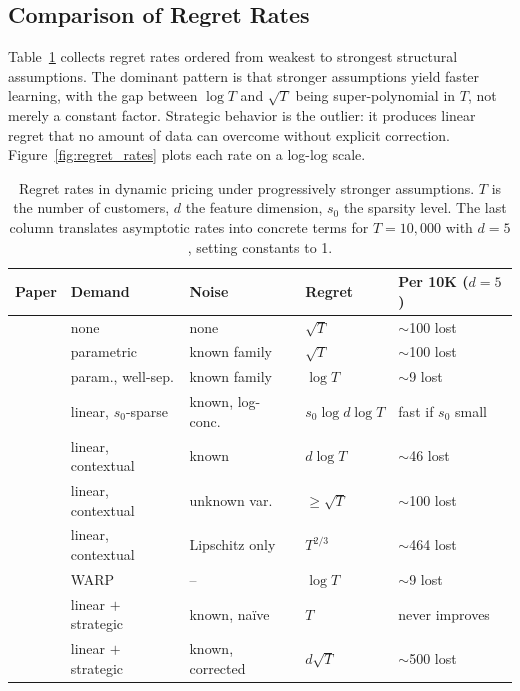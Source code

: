 \subsection{Comparison of Regret Rates}
\label{sec:comparison}

Table~\ref{tab:regret_comparison} collects regret rates ordered from weakest to strongest structural assumptions. The dominant pattern is that stronger assumptions yield faster learning, with the gap between $\log T$ and $\sqrt{T}$ being super-polynomial in $T$, not merely a constant factor. Strategic behavior is the outlier: it produces linear regret that no amount of data can overcome without explicit correction. Figure~\ref{fig:regret_rates} plots each rate on a log-log scale.

\begin{table}[!htbp]
\centering
\small
\caption{Regret rates in dynamic pricing under progressively stronger assumptions. $T$ is the number of customers, $d$ the feature dimension, $s_0$ the sparsity level. The last column translates asymptotic rates into concrete terms for $T = 10{,}000$ with $d = 5$, setting constants to 1.}
\label{tab:regret_comparison}
\begin{tabular}{@{}llllp{2.8cm}@{}}
\toprule
Paper & Demand & Noise & Regret & Per 10K ($d{=}5$) \\
\midrule
\citet{Kleinberg2003} & none & none & $\sqrt{T}$ & $\sim$100 lost \\
\citet{Broder2012} & parametric & known family & $\sqrt{T}$ & $\sim$100 lost \\
\citet{Broder2012} & param., well-sep. & known family & $\log T$ & $\sim$9 lost \\
\citet{Javanmard2019} & linear, $s_0$-sparse & known, log-conc. & $s_0 \log d \log T$ & fast if $s_0$ small \\
\citet{Xu2021} & linear, contextual & known & $d \log T$ & $\sim$46 lost \\
\citet{Xu2021} & linear, contextual & unknown var. & $\geq \sqrt{T}$ & $\sim$100 lost \\
\citet{Tullii2024} & linear, contextual & Lipschitz only & $T^{2/3}$ & $\sim$464 lost \\
\citet{Misra2019} & WARP & -- & $\log T$ & $\sim$9 lost \\
\citet{Liu2024strategic} & linear $+$ strategic & known, na\"ive & $T$ & never improves \\
\citet{Liu2024strategic} & linear $+$ strategic & known, corrected & $d\sqrt{T}$ & $\sim$500 lost \\
\bottomrule
\end{tabular}
\end{table}

